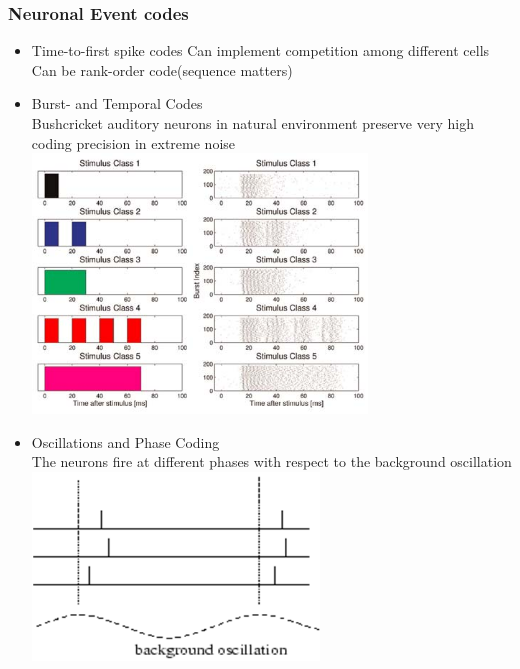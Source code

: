 \documentclass[english,11pt]{article}
\begin{document}
\subsubsection{Neuronal Event codes}

\begin{itemize}
\item Time-to-first spike codes
\subitem Can implement competition among different cells
\subitem Can be rank-order code(sequence matters)

\item  Burst- and Temporal Codes\\
Bushcricket auditory neurons in natural environment preserve very high coding precision in extreme noise\\
\includegraphics[width=0.7\textwidth]{burst-code.png}

\item  Oscillations and Phase Coding\\
The neurons fire at different phases with respect to the background oscillation\\
\includegraphics[width=0.6\textwidth]{phase-code.png}


\end{itemize}
\end{document}
